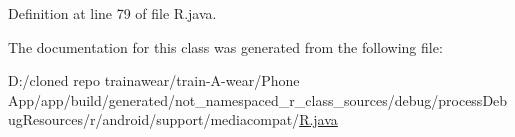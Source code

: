 Definition at line 79 of file R.\+java.



The documentation for this class was generated from the following file\+:\begin{DoxyCompactItemize}
\item 
D\+:/cloned repo trainawear/train-\/\+A-\/wear/\+Phone App/app/build/generated/not\+\_\+namespaced\+\_\+r\+\_\+class\+\_\+sources/debug/process\+Debug\+Resources/r/android/support/mediacompat/\mbox{\hyperlink{process_debug_resources_2r_2android_2support_2mediacompat_2_r_8java}{R.\+java}}\end{DoxyCompactItemize}
